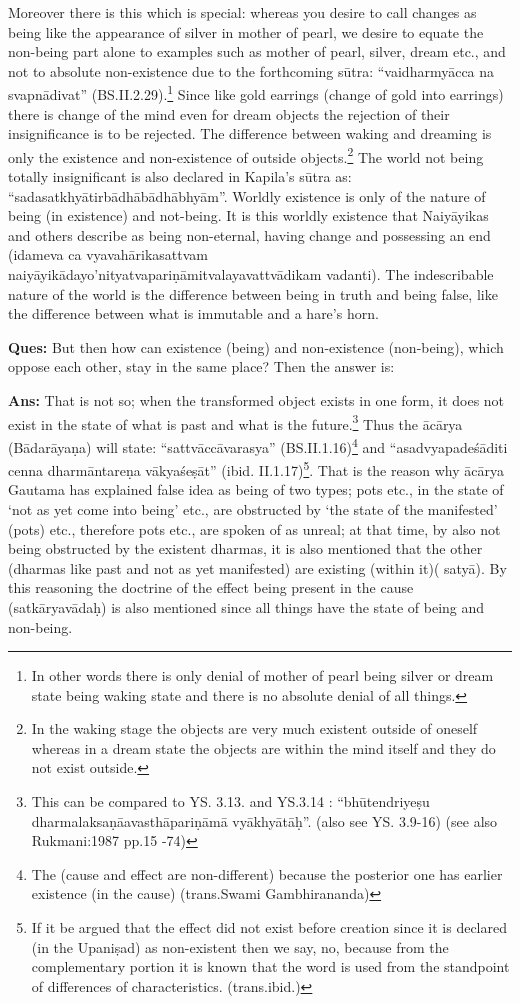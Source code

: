 Moreover there is this which is special: whereas you desire to call changes as being like the appearance of silver in mother of pearl, we desire to equate the non-being part alone to examples such as mother of pearl, silver, dream etc., and not to absolute non-existence due to the forthcoming sūtra: “vaidharmyācca na svapnādivat” (BS.II.2.29).\footnote{In other words there is only denial of mother of pearl being silver or dream state being waking state and there is no absolute denial of all things.} Since like gold earrings (change of gold into earrings) there is change of the mind even for dream objects the rejection of their insignificance is to be rejected. The difference between waking and dreaming is only the existence and non-existence of outside objects.\footnote{In the waking stage the objects are very much existent outside of oneself whereas in a dream state the objects are within the mind itself and they do not exist outside.} The world not being totally insignificant is also declared in Kapila’s sūtra as: “sadasatkhyātirbādhābādhābhyām”.     Worldly existence is only of the nature of being (in existence) and not-being. It is this worldly existence that Naiyāyikas and others describe as being non-eternal, having change and possessing an end (idameva ca vyavahārikasattvam naiyāyikādayo’nityatvapariṇāmitvalayavattvādikam vadanti). The indescribable nature of the world is the difference between being in truth and being false, like the difference between what is immutable and a hare’s horn.

\textbf{Ques:} But then how can existence (being) and non-existence (non-being), which oppose each other, stay in the same place? Then the answer is: 

\textbf{Ans:} That is not so; when the transformed object exists in one form, it does not exist in the state of what is past and what is the future.\footnote{This can be compared to YS. 3.13. and YS.3.14 : “bhūtendriyeṣu dharmalaksaṇāavasthāpariṇāmā vyākhyātāḥ”. (also see YS. 3.9-16) (see also Rukmani:1987 pp.15 -74)} Thus the ācārya (Bādarāyaṇa) will state: “sattvāccāvarasya” (BS.II.1.16)\footnote{The (cause and effect are non-different) because the posterior one has earlier existence (in the cause) (trans.Swami Gambhirananda)} and “asadvyapadeśāditi cenna dharmāntareṇa vākyaśeṣāt” (ibid. II.1.17)\footnote{If it be argued that the effect did not exist before creation since it is declared (in the Upaniṣad) as non-existent then we say, no, because from the complementary portion it is known that the word is used from the standpoint of differences of characteristics. (trans.ibid.)}. That is the reason why ācārya Gautama has explained false idea as being of two types; pots etc., in the state of ‘not as yet come into being’ etc., are obstructed by ‘the state of  the manifested’ (pots) etc., therefore pots etc., are spoken of as unreal; at that time, by also not being obstructed by the existent dharmas, it is also mentioned  that the other (dharmas like past and not as yet manifested) are existing (within it)( satyā). By this reasoning the doctrine of the effect being present in the cause (satkāryavādaḥ) is also mentioned since all things have the state of being and non-being. 

